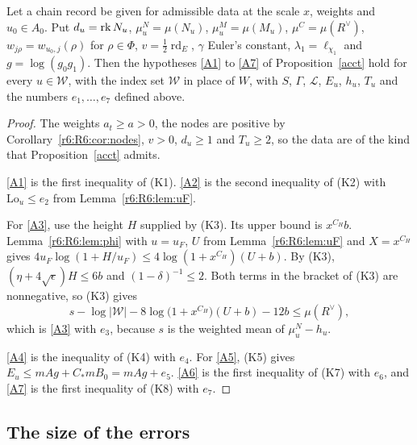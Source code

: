 \begin{proposition}\label{r6:R6:prop:A1A7}
Let a chain record be given for admissible data at the scale $x$, weights and $u_0\in A_0$. Put $d_u=\operatorname{rk} N_u$, $\mu^N_u=\mu(N_u)$, $\mu^M_u=\mu(M_u)$, $\mu^C=\mu(R^\vee)$, $w_{j\rho}=w_{u_0,j}(\rho)$ for $\rho\in\Phi$, $v=\frac12\operatorname{rd}_E$, $\gamma$ Euler's constant, $\lambda_1=\ell_{\chi_1}$ and $g=\log(g_0g_1)$. Then the hypotheses \eqref{A1} to \eqref{A7} of Proposition~\ref{acct} hold for every $u\in\mathcal W$, with the index set $\mathcal W$ in place of $W$, with $S$, $\Gamma$, $\mathcal L$, $E_u$, $h_u$, $T_u$ and the numbers $e_1,\dots,e_7$ defined above.
\end{proposition}

\begin{proof}
The weights $a_t\ge a>0$, the nodes are positive by Corollary~\ref{r6:R6:cor:nodes}, $v>0$, $d_u\ge1$ and $T_u\ge2$, so the data are of the kind that Proposition~\ref{acct} admits.

\eqref{A1} is the first inequality of (K1). \eqref{A2} is the second inequality of (K2) with $\mathrm{Lo}_u\le e_2$ from Lemma~\ref{r6:R6:lem:uF}.

For \eqref{A3}, use the height $H$ supplied by (K3). Its upper bound is $x^{C_H}b$. Lemma~\ref{r6:R6:lem:phi} with $u=u_F$, $U$ from Lemma~\ref{r6:R6:lem:uF} and $X=x^{C_H}$ gives $4u_F\log(1+H/u_F)\le4\log(1+x^{C_H})(U+b)$. By (K3), $(\eta+4\sqrt\epsilon)H\le6b$ and $(1-\delta)^{-1}\le2$. Both terms in the bracket of (K3) are nonnegative, so (K3) gives
\[
s-\log\lvert\mathcal W\rvert-8\log\big(1+x^{C_H}\big)(U+b)-12b\le\mu(R^\vee),
\]
which is \eqref{A3} with $e_3$, because $s$ is the weighted mean of $\mu^N_u-h_u$.

\eqref{A4} is the inequality of (K4) with $e_4$. For \eqref{A5}, (K5) gives $E_u\le mAg+C_\ast mB_0=mAg+e_5$. \eqref{A6} is the first inequality of (K7) with $e_6$, and \eqref{A7} is the first inequality of (K8) with $e_7$.
\end{proof}

\subsection{The size of the errors}\label{r6:R6:sec:errors}

